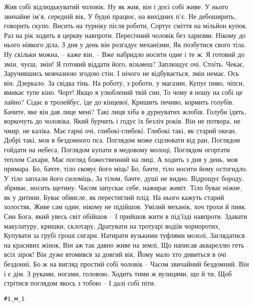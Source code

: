 \begin{multicols}{2}
\obeycr
Жив собі відлюдькуватий чоловік. 
Ну як жив, він і досі собі живе.
У нього звичайне ім'я, середній вік, 
У будні працює, на вихідних п'є.
\smallskip
Не дебоширить, говорить скупо.
Висить на турніку після роботи,
Сортує сміття на мільйон купок.
Раз на рік ходить в церкву навпроти.
\smallskip
Пересічний чоловік без харизми.
Нікому до нього ніякого діла,
З дня у день він розгадує механізми,
Як позбутися свого тіла.
\smallskip
Ну скільки можна, – каже він, –
Вже набридло носити одне і те ж.
Я готовий до змін, чуєш, змін!
Я готовий віддати його, візьмеш?
\smallskip
Заплющує очі. Стоїть. Чекає,
Заручившись мовчазною згодою стін.
І нічого не відбувається, змін немає.
Ось він. Дзеркало. За свідка тінь.
\smallskip
На роботу, з роботи, у магазин,
Купує пиво, чіпси, вмикає тупе кіно.
Чорт! Якщо я улюблений твій син,
То чому я ношу на собі це лайно?
\smallskip
Сідає в тролейбус, їде до кінцевої,
Кришить печиво, кормить голубів.
Бачите, яке він дав лице мені?
Такі лиця хіба в дурнуватих жлобів.
\smallskip
Голуби їдять, воркочуть до чоловіка,
Який бурчить і годує їх безліч років.
Він не потвора, не чмир, не каліка.
Має гарні очі, глибокі-глибокі.
\smallskip
Глибокі такі, як старий океан,
Добрі такі, мов в бездомного пса.
Поглядом може сцілювати від ран,
Поглядом гойдати на небеса,
\smallskip
Поглядом купати в медовому молоці,
Поглядом огортати теплом Сахари,
Має погляд божественний на лиці,
А ходить з дня у день, мов примара.
\smallskip
Бо, бачте, тіло сковує його міць!
Бо, бачте, тіло носити йому остогидло.
У тіло запхали його силоміць,
За тілом, бачте, душі не видно.
\smallskip
Відрощує бороду, збриває, носить щетину.
Часом запускає себе, нажирає живіт.
Тіло буває ніжне, як у дитини,
Буває обвисле, як перестиглий плід.
\smallskip
На нього кажуть старий холостяк,
Живе сам один, нікому не підійшов.
Умілий механік, хоч трохи й пияк. 
Син Бога, який увесь світ обійшов –
І прийшов жити в під'їзді навпроти.
\smallskip
Здавати макулатуру, кришки, склотару, 
Дратувати на тротуарі водіїв чорноротих,
Купувати за грубі гроші сигари. 
\smallskip
Натирати вузькими туфлями мозолі,
Заглядатися на красивих жінок,
Він аж так давно живе на землі,
Що написав аквареллю геть всіх зірок!
\smallskip
Він дуже втомився за довгий вік,
Йому мало хто дивиться в очі бездонні,
Бо ж на вигляд простий собі чоловік –
Часом звичайний бездомний.
\smallskip
Він і є дім. З руками, ногами, головою.
Ходить тими ж вулицями, що й ти,
Щоб стрітися поглядом якось з тобою –
І далі собі піти.
\restorecr
\end{multicols}

\verb|#і_м_і|

